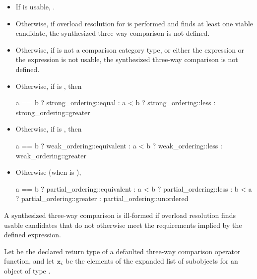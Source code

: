 \begin{itemize}
\item
If  is usable,
.

\item
Otherwise, if overload resolution for  is performed and
finds at least one viable candidate,
the synthesized three-way comparison is not defined.

\item
Otherwise, if  is not a comparison category type, or either
the expression  or the expression 
is not usable,
the synthesized three-way comparison is not defined.

\item
Otherwise, if  is , then
\begin{codeblock}
a == b ? strong_ordering::equal :
a < b  ? strong_ordering::less :
         strong_ordering::greater
\end{codeblock}

\item
Otherwise, if  is , then
\begin{codeblock}
a == b ? weak_ordering::equivalent :
a < b  ? weak_ordering::less :
         weak_ordering::greater
\end{codeblock}

\item
Otherwise (when  is ),
\begin{codeblock}
a == b ? partial_ordering::equivalent :
a < b  ? partial_ordering::less :
b < a  ? partial_ordering::greater :
         partial_ordering::unordered
\end{codeblock}
\end{itemize}

\begin{note}
A synthesized three-way comparison is ill-formed
if overload resolution finds usable candidates
that do not otherwise meet the requirements implied by the defined expression.
\end{note}

\pnum
Let  be the declared return type of
a defaulted three-way comparison operator function, and
let $\texttt{x}_i$ be the elements of
the expanded list of subobjects for
an object  of type .

